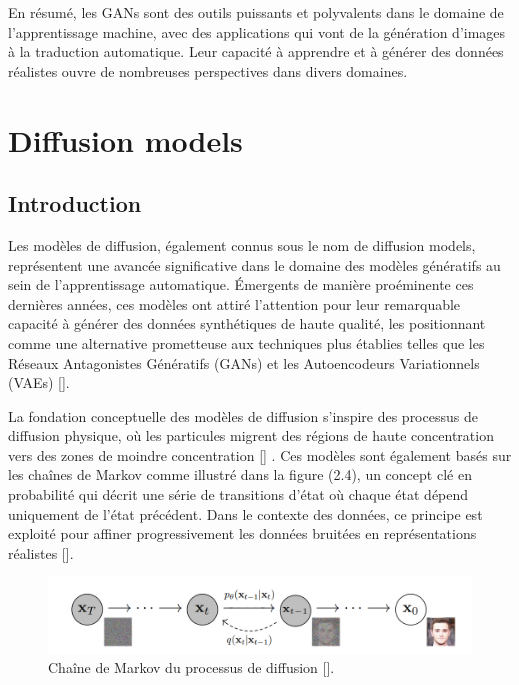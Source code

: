 En résumé, les GANs sont des outils puissants et polyvalents dans le domaine de
l'apprentissage machine, avec des applications qui vont de la génération
d'images à la traduction automatique. Leur capacité à apprendre et à générer
des données réalistes ouvre de nombreuses perspectives dans divers domaines.

\section{Diffusion models}
\subsection{Introduction}

Les modèles de diffusion, également connus sous le nom de diffusion models,
représentent une avancée significative dans le domaine des modèles génératifs
au sein de l'apprentissage automatique. Émergents de manière proéminente ces
dernières années, ces modèles ont attiré l'attention pour leur remarquable
capacité à générer des données synthétiques de haute qualité, les positionnant
comme une alternative prometteuse aux techniques plus établies telles que les
Réseaux Antagonistes Génératifs (GANs) et les Autoencodeurs Variationnels
(VAEs) [\cite{dhariwal2021diffusion}].

La fondation conceptuelle des modèles de diffusion s'inspire des processus de
diffusion physique, où les particules migrent des régions de haute
concentration vers des zones de moindre concentration [\cite{ho2020denoising}]
. Ces modèles sont également basés sur les chaînes de Markov comme illustré
dans la figure (2.4), un concept clé en probabilité qui décrit une série de
transitions d'état où chaque état dépend uniquement de l'état précédent. Dans
le contexte des données, ce principe est exploité pour affiner progressivement
les données bruitées en représentations réalistes [\cite{yang2022diffusion}].

\begin{figure}[hbt!]
	\centering
	\includegraphics[width=12cm]{images_pfe/markov.png}
	\caption{Chaîne de Markov du processus de diffusion [\cite{ho2020denoising}].}
	\label{fig:markov}
\end{figure}
\FloatBarrier

